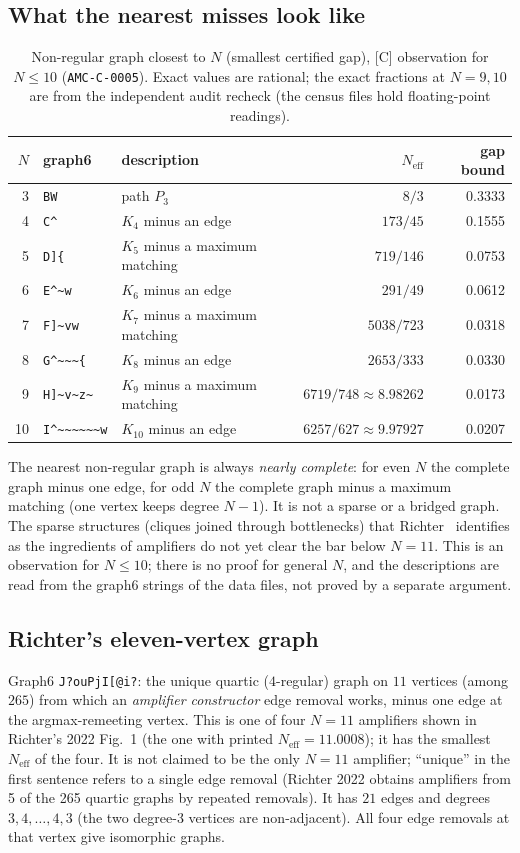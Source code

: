 \documentclass[10pt]{article}
\newcommand{\tier}[1]{\textsf{[#1]}}
\newcommand{\tC}{\tier{C}}
\newcommand{\Neff}{N_{\mathrm{eff}}}
\begin{document}
\subsection{What the nearest misses look like}
\begin{table}[h]\centering\small
\caption{Non-regular graph closest to $N$ (smallest certified gap), \tC{} observation for $N\le10$ (\texttt{AMC-C-0005}). Exact values are rational; the exact fractions at $N=9,10$ are from the independent audit recheck (the census files hold floating-point readings).}
\begin{tabular}{rllrr}\toprule
$N$ & graph6 & description & $\Neff$ & gap bound\\\midrule
3 & \verb+BW+ & path $P_3$ & $8/3$ & 0.3333\\
4 & \verb+C^+ & $K_4$ minus an edge & $173/45$ & 0.1555\\
5 & \verb+D]{+ & $K_5$ minus a maximum matching & $719/146$ & 0.0753\\
6 & \verb+E^~w+ & $K_6$ minus an edge & $291/49$ & 0.0612\\
7 & \verb+F]~vw+ & $K_7$ minus a maximum matching & $5038/723$ & 0.0318\\
8 & \verb+G^~~~{+ & $K_8$ minus an edge & $2653/333$ & 0.0330\\
9 & \verb+H]~v~z~+ & $K_9$ minus a maximum matching & $6719/748\approx8.98262$ & 0.0173\\
10 & \verb+I^~~~~~~w+ & $K_{10}$ minus an edge & $6257/627\approx9.97927$ & 0.0207\\\bottomrule
\end{tabular}
\end{table}
The nearest non-regular graph is always \emph{nearly complete}: for even $N$ the complete graph minus one edge, for odd $N$ the complete graph minus a maximum matching (one vertex keeps degree $N-1$). It is not a sparse or a bridged graph. The sparse
structures (cliques joined through bottlenecks) that Richter~\cite{rich22} identifies as the ingredients of amplifiers do not yet clear the bar below $N=11$. This is an observation for $N\le10$; there is no proof for general $N$, and the
descriptions are read from the graph6 strings of the data files, not proved by a separate argument.

\subsection{Richter's eleven-vertex graph}
Graph6 \verb+J?ouPjI[@i?+: the unique quartic ($4$-regular) graph on $11$ vertices (among $265$) from which an \emph{amplifier constructor} edge removal works, minus one edge at the argmax-remeeting vertex. This is one of four $N=11$ amplifiers shown in Richter's 2022 Fig.~1 (the one with printed $N_{\mathrm{eff}}=11.0008$); it has the smallest $N_{\mathrm{eff}}$ of the four. It is not claimed to be the only $N=11$ amplifier; ``unique'' in the first sentence refers to a single edge removal (Richter 2022 obtains amplifiers from 5 of the 265 quartic graphs by repeated removals). It has $21$ edges and degrees $3,4,\dots,4,3$ (the two degree-3 vertices are non-adjacent). All four edge removals at that vertex give isomorphic graphs.
\end{document}
